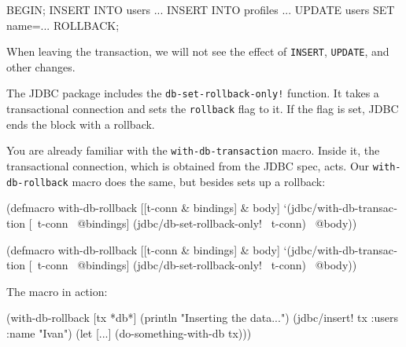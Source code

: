 \begin{english}
  \begin{sql}
BEGIN;
INSERT INTO users ...
INSERT INTO profiles ...
UPDATE users SET name=...
ROLLBACK;
  \end{sql}
\end{english}

When leaving the transaction, we will not see the effect of \verb|INSERT|, \verb|UPDATE|, and other changes.

The JDBC package includes the \texttt{db-set-roll\-back-only!} function. It takes a transactional connection and sets the \verb|rollback| flag to it. If the flag is set, JDBC ends the block with a rollback.


You are already familiar with the \texttt{with-db-tran\-saction} macro. Inside it, the transactional connection, which is obtained from the JDBC spec, acts. Our \verb|with-db-rollback| macro does the same, but besides sets up a rollback:

\ifnarrow

\begin{english}
  \begin{clojure}
(defmacro with-db-rollback
  [[t-conn & bindings] & body]
  `(jdbc/with-db-transaction
     [~t-conn ~@bindings]
     (jdbc/db-set-rollback-only!
       ~t-conn)
     ~@body))
  \end{clojure}
\end{english}

\else

\begin{english}
  \begin{clojure}
(defmacro with-db-rollback
  [[t-conn & bindings] & body]
  `(jdbc/with-db-transaction [~t-conn ~@bindings]
     (jdbc/db-set-rollback-only! ~t-conn)
     ~@body))
  \end{clojure}
\end{english}

\fi

\noindent
The macro in action:

\ifnarrow

\begin{english}
  \begin{clojure}
(with-db-rollback [tx *db*]
  (println "Inserting the data...")
  (jdbc/insert! tx
    :users {:name "Ivan"})
  (let [...]
    (do-something-with-db tx)))
  \end{clojure}
\end{english}

